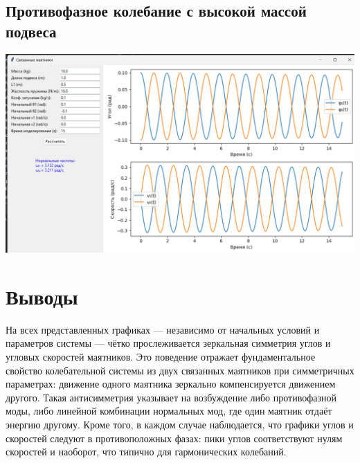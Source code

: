 \documentclass[a4paper,11pt]{article}
\theoremstyle{definition}
\begin{document}
    \subsection{Противофазное колебание с высокой массой подвеса}
        \includegraphics[scale=0.5]{4. Connected pendulum/demo results/unsynced_heavy_pendulums}


\section*{Выводы}
    На всех представленных графиках — независимо от начальных условий и параметров системы — чётко прослеживается
    зеркальная симметрия углов и угловых скоростей маятников.
    Это поведение отражает фундаментальное свойство колебательной системы из двух связанных маятников при симметричных
    параметрах: движение одного маятника зеркально компенсируется движением другого.
    Такая антисимметрия указывает на возбуждение либо противофазной моды, либо линейной комбинации нормальных мод,
    где один маятник отдаёт энергию другому.
    Кроме того, в каждом случае наблюдается, что графики углов и скоростей следуют в противоположных фазах: пики углов
    соответствуют нулям скоростей и наоборот, что типично для гармонических колебаний.
\end{document}
